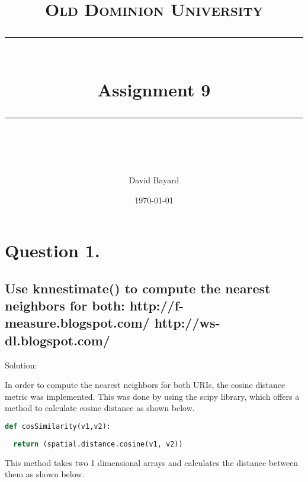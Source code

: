 \documentclass[11pt]{scrartcl} %
\title{
	\normalfont\normalsize
	\textsc{Old Dominion University}\\ %
	\vspace{25pt} %
	\rule{\linewidth}{0.5pt}\\ %
	\vspace{20pt} %
	{\huge Assignment 9}\\ %
	\vspace{12pt} %
	\rule{\linewidth}{2pt}\\ %
	\vspace{12pt} %
}
\author{\LARGE David Bayard} %
\date{\normalsize\today} %
\begin{document}

\lstset{style=pythonStyle}


\maketitle %

\pagebreak
\section*{Question 1.}




\subsection*{ Use knnestimate() to compute the nearest neighbors for both:
	http://f-measure.blogspot.com/
	http://ws-dl.blogspot.com/}
\bigskip\bigskip


\large Solution:
\newline \small

\tabto{2.0cm} In order to compute the nearest neighbors for both URIs, the cosine distance metric was implemented. This was done by using the scipy library, which offers a method to calculate cosine distance as shown below. 
\newline \newline

\begin{lstlisting}[language = Python, caption = cosine distance metric]
def cosSimilarity(v1,v2):
  
  return (spatial.distance.cosine(v1, v2))
\end{lstlisting} \bigskip 

\tabto{2.0cm} This method takes two 1 dimensional arrays and calculates the distance between them as shown below.
\end{document}
